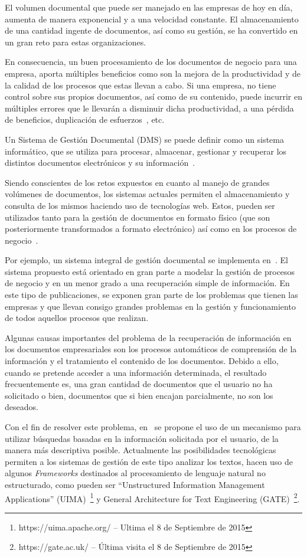 \documentclass[runningheads,a4paper]{llncs}
\theoremstyle{break}
\begin{document}
El volumen documental que puede ser manejado en las empresas de hoy en día, aumenta de manera exponencial y a una velocidad constante. El almacenamiento de una cantidad ingente de documentos, así como su gestión, se ha convertido en un gran reto para estas organizaciones.

En consecuencia, un buen procesamiento de los documentos de negocio para una empresa, aporta múltiples beneficios como son la mejora de la productividad y de la calidad de los procesos que estas llevan a cabo. Si una  empresa, no tiene control sobre sus propios documentos, así como de su contenido, puede incurrir en múltiples errores que le llevarán a disminuir dicha productividad, a una pérdida de beneficios, duplicación de esfuerzos~\cite{intro:2}, etc.

Un Sistema de Gestión Documental (DMS) se puede definir como un sistema informático, que se utiliza para procesar, almacenar, gestionar y  recuperar los distintos documentos electrónicos y su información~\cite{intro:4}.

Siendo conscientes de los retos expuestos en cuanto al manejo de grandes volúmenes de documentos, los sistemas actuales permiten el almacenamiento y consulta de los mismos haciendo uso de tecnologías web. Estos, pueden ser utilizados tanto para la gestión de documentos en formato físico (que son posteriormente transformados a formato electrónico) así como en los procesos de negocio~\cite{intro:5}.

Por ejemplo, un sistema integral de gestión documental se implementa en~\cite{intro:6}. El sistema propuesto está orientado en gran parte a modelar la gestión de procesos de negocio y en un menor grado a una recuperación simple de información. En este tipo de publicaciones, se exponen gran parte de los problemas que tienen las empresas y que llevan consigo grandes problemas en la gestión y funcionamiento de todos aquellos procesos que realizan.

Algunas causas importantes del problema de la recuperación de información en los documentos empresariales son los procesos automáticos de comprensión de la información y el tratamiento el contenido de los documentos. Debido a ello, cuando se pretende acceder a una información determinada, el resultado frecuentemente es, una gran cantidad de documentos que el usuario no ha solicitado o bien, documentos que si bien encajan parcialmente, no son los deseados.

Con el fin de resolver este problema, en~\cite{intro:8} se propone el uso de un mecanismo para utilizar búsquedas basadas en la información solicitada por el usuario, de la manera más descriptiva posible. Actualmente las posibilidades tecnológicas permiten a los sistemas de gestión de este tipo analizar los textos, hacen uso de algunos \textit{Frameworks} destinados al procesamiento de lenguaje natural no estructurado, como pueden ser “Unstructured Information Management Applications” (UIMA)~\footnote{https://uima.apache.org/ -- Ultima el 8 de Septiembre de 2015} y General Architecture for Text Engineering (GATE)~\footnote{https://gate.ac.uk/ -- Última visita el 8 de Septiembre de 2015}.
\end{document}
